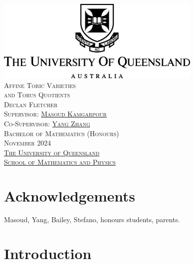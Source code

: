 \documentclass[12pt]{amsart}
\theoremstyle{plain}
\begin{document}

\begin{center}
\thispagestyle{empty}
\includegraphics[width=10cm]{../images/UQLogo.jpg} \\ 
\vspace{3cm}
{\LARGE\textsc{Affine Toric Varieties}} \\
\vspace{0.1cm}
{\LARGE\textsc{and Torus Quotients}} \\
\vspace{0.5cm}
{\textsc{Declan Fletcher}} \\
\vspace{7cm}
{\textsc{Supervisor: \href{https://sites.google.com/site/masoudkomi/home}{Masoud Kamgarpour}}} \\
{\textsc{Co-Supervisor: \href{https://sites.google.com/site/yangzhang139/home}{Yang Zhang}}} \\
\vspace{1cm}
{\textsc{ Bachelor of Mathematics (Honours)}} \\
\vspace{0.1cm}
{\textsc{November 2024}} \\
\vspace{1cm}
{\textsc{\href{https://www.uq.edu.au/}{The University of Queensland}}} \\
{\textsc{\href{https://smp.uq.edu.au/}{School of Mathematics and Physics}}}
\end{center}

\newpage
\hfill

\newpage
\tableofcontents

\newpage
\hfill

\newpage
{}
\section*{Acknowledgements}
Masoud, Yang, Bailey, Stefano, honours students, parents.

\newpage
\hfill

\newpage
{}
\section*{Introduction}\label{chapter:introduction}
\end{document}
